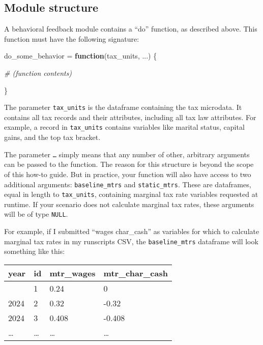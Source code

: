 \documentclass[
]{article}
\newenvironment{Shaded}{\begin{snugshade}}{\end{snugshade}}
\newcommand{\CommentTok}[1]{\textcolor[rgb]{0.56,0.35,0.01}{\textit{#1}}}
\newcommand{\ControlFlowTok}[1]{\textcolor[rgb]{0.13,0.29,0.53}{\textbf{#1}}}
\newcommand{\NormalTok}[1]{#1}
\newcommand{\OtherTok}[1]{\textcolor[rgb]{0.56,0.35,0.01}{#1}}
\begin{document}
\hypertarget{module-structure}{%
\subsection{Module structure}\label{module-structure}}

A behavioral feedback module contains a ``do'' function, as described
above. This function must have the following signature:

\begin{Shaded}
\begin{Highlighting}[]
\NormalTok{do\_some\_behavior }\OtherTok{=} \ControlFlowTok{function}\NormalTok{(tax\_units, ...) \{ }

  \CommentTok{\# (function contents)}

\NormalTok{\}}
\end{Highlighting}
\end{Shaded}

The parameter \texttt{tax\_units} is the dataframe containing the tax
microdata. It contains all tax records and their attributes, including
all tax law attributes. For example, a record in \texttt{tax\_units}
contains variables like marital status, capital gains, and the top tax
bracket.

The parameter \texttt{…} simply means that any number of other,
arbitrary arguments can be passed to the function. The reason for this
structure is beyond the scope of this how-to guide. But in practice,
your function will also have access to two additional arguments:
\texttt{baseline\_mtrs} and \texttt{static\_mtrs}. These are dataframes,
equal in length to \texttt{tax\_units}, containing marginal tax rate
variables requested at runtime. If your scenario does not calculate
marginal tax rates, these arguments will be of type \texttt{NULL}.

For example, if I submitted ``wages char\_cash'' as variables for which
to calculate marginal tax rates in my runscripts CSV, the
\texttt{baseline\_mtrs} dataframe will look something like this:

\begin{longtable}[]{@{}llll@{}}
\toprule\noalign{}
year & id & mtr\_wages & mtr\_char\_cash \\
\midrule\noalign{}
\endhead
\bottomrule\noalign{}
\endlastfoot
2024 & 1 & 0.24 & 0 \\
2024 & 2 & 0.32 & -0.32 \\
2024 & 3 & 0.408 & -0.408 \\
\ldots{} & \ldots{} & \ldots{} & \ldots{} \\
\end{longtable}
\end{document}
